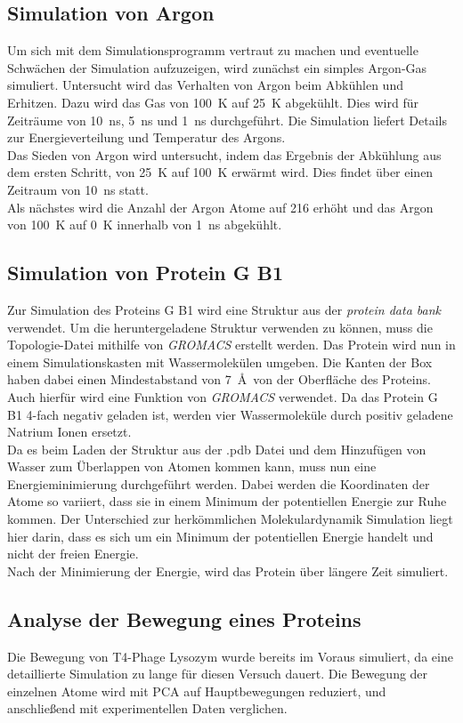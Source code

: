 \subsection{Simulation von Argon}

Um sich mit dem Simulationsprogramm vertraut zu machen und eventuelle Schwächen der Simulation aufzuzeigen, wird zunächst ein simples Argon-Gas simuliert.
Untersucht wird das Verhalten von Argon beim Abkühlen und Erhitzen.
Dazu wird das Gas von 100~K auf 25~K abgekühlt. Dies wird für Zeiträume von 10~ns, 5~ns und 1~ns durchgeführt. Die Simulation liefert Details zur Energieverteilung und Temperatur des Argons.
\\ \noindent
Das Sieden von Argon wird untersucht, indem das Ergebnis der Abkühlung aus dem ersten Schritt, von 25~K auf 100~K erwärmt wird. Dies findet über einen Zeitraum von 10~ns statt.
\\ \noindent
Als nächstes wird die Anzahl der Argon Atome auf 216 erhöht und das Argon von 100~K auf 0~K innerhalb von 1~ns abgekühlt.

\subsection{Simulation von Protein G B1}
Zur Simulation des Proteins G B1 wird eine Struktur aus der \emph{protein data bank} verwendet. Um die heruntergeladene Struktur verwenden zu können, muss die Topologie-Datei mithilfe von \emph{GROMACS} erstellt werden.
Das Protein wird nun in einem Simulationskasten mit Wassermolekülen umgeben. Die Kanten der Box haben dabei einen Mindestabstand von 7~\AA ~von der Oberfläche des Proteins. Auch hierfür wird eine Funktion von \emph{GROMACS} verwendet.
Da das Protein G B1 4-fach negativ geladen ist, werden vier Wassermoleküle durch positiv geladene Natrium Ionen ersetzt.
\\ \noindent
Da es beim Laden der Struktur aus der .pdb Datei und dem Hinzufügen von Wasser zum Überlappen von Atomen kommen kann, muss nun eine Energieminimierung durchgeführt werden. Dabei werden die Koordinaten der Atome so variiert, dass sie in einem Minimum der potentiellen Energie zur Ruhe kommen.
Der Unterschied zur herkömmlichen Molekulardynamik Simulation liegt hier darin, dass es sich um ein Minimum der potentiellen Energie handelt und nicht der freien Energie.
\\ \noindent
Nach der Minimierung der Energie, wird das Protein über längere Zeit simuliert.

\subsection{Analyse der Bewegung eines Proteins}
Die Bewegung von T4-Phage Lysozym wurde bereits im Voraus simuliert, da eine detaillierte Simulation zu lange für diesen Versuch dauert.
Die Bewegung der einzelnen Atome wird mit PCA auf Hauptbewegungen reduziert, und anschließend mit experimentellen Daten verglichen.
